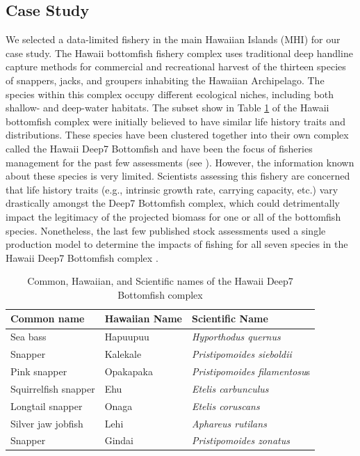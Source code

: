 \documentclass[oneside,12pt,final]{sty/ucthesis-CA2012}
\let\cite\citep                             %
\begin{document}
\begin{mainmatter}
\subsection{Case Study}
We selected a data-limited fishery in the main Hawaiian Islands (MHI) for our case study. The Hawaii bottomfish fishery complex uses traditional deep handline capture methods for commercial and recreational harvest of the thirteen species of snappers, jacks, and groupers inhabiting the Hawaiian Archipelago. The species within this complex occupy different ecological niches, including both shallow- and deep-water habitats. The subset show in Table \ref{names} of the Hawaii bottomfish complex were initially believed to have similar life history traits and distributions. These species have been clustered together into their own complex called the Hawaii Deep7 Bottomfish and have been the focus of fisheries management for the past few assessments (see \citealt{langseth2018stock}). However, the information known about these species  is very limited. Scientists assessing this fishery are concerned that life history traits (e.g., intrinsic growth rate, carrying capacity, etc.) vary drastically amongst the Deep7 Bottomfish complex, which could detrimentally impact the legitimacy of the projected biomass for one or all of the bottomfish species. Nonetheless, the last few published stock assessments used a single production model to determine the impacts of fishing for all seven species in the Hawaii Deep7 Bottomfish complex  \cite{brodziak2009hawaiian,langseth2018stock}. 

\begin{table}[H]
\centering
\caption{Common, Hawaiian, and Scientific names of the Hawaii Deep7 Bottomfish complex}
\begin{tabular}{lll}
  \hline \small
 Common name & Hawaiian Name & Scientific Name \\ 
   \hline
Sea bass & Hapuupuu & \textit{Hyporthodus quernus} \\
Snapper & Kalekale & \textit{Pristipomoides sieboldii} \\
Pink snapper & Opakapaka & \textit{Pristipomoides filamentosu}s \\
Squirrelfish snapper & Ehu & \textit{Etelis carbunculus} \\
Longtail snapper & Onaga & \textit{Etelis coruscans} \\
Silver jaw jobfish & Lehi & \textit{Aphareus rutilans} \\
Snapper & Gindai & \textit{Pristipomoides zonatus} \\
   \hline
\end{tabular} 
\label{names}
\end{table}


\end{mainmatter}
\end{document}
